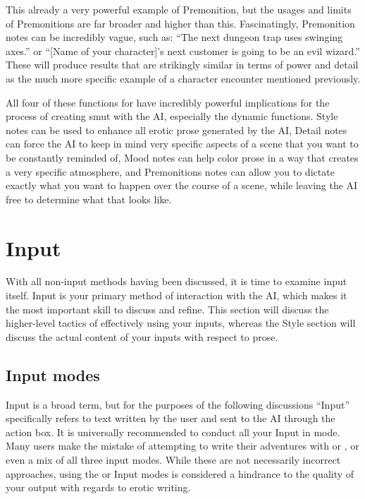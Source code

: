 \documentclass[Coomer-main.tex]{subfiles}
\begin{document}
This already a very powerful example of Premonition, but the usages and limits of Premonitions are far broader and higher than this.
Fascinatingly, Premonition notes can be incredibly vague, such as: “The next dungeon trap uses swinging axes.” or “[Name of your character]’s next customer is going to be an evil wizard.” These will produce results that are strikingly similar in terms of power and detail as the much more specific example of a character encounter mentioned previously.

All four of these functions for \an have incredibly powerful implications for the process of creating smut with the AI, especially the dynamic functions.
Style notes can be used to enhance all erotic prose generated by the AI, Detail notes can force the AI to keep in mind very specific aspects of a scene that you want to be constantly reminded of, Mood notes can help color prose in a way that creates a very specific atmosphere, and Premonitions notes can allow you to dictate exactly what you want to happen over the course of a scene, while leaving the AI free to determine what that looks like.

\chapter{Input}
\label{ch:input}

With all non-input methods having been discussed, it is time to examine input itself.
Input is your primary method of interaction with the AI, which makes it the most important skill to discuss and refine.
This section will discuss the higher-level tactics of effectively using your inputs, whereas the Style section will discuss the actual content of your inputs with respect to prose.

\section{Input modes}
\label{sec:inputmodes}

Input is a broad term, but for the purposes of the following discussions “Input” specifically refers to text written by the user and sent to the AI through the action box.
It is universally recommended to conduct all your Input in \story mode.
Many users make the mistake of attempting to write their adventures with \Do or \say, or even a mix of all three input modes.
While these are not necessarily incorrect approaches, using the \Do or \say Input modes is considered a hindrance to the quality of your output with regards to erotic writing.
\end{document}
